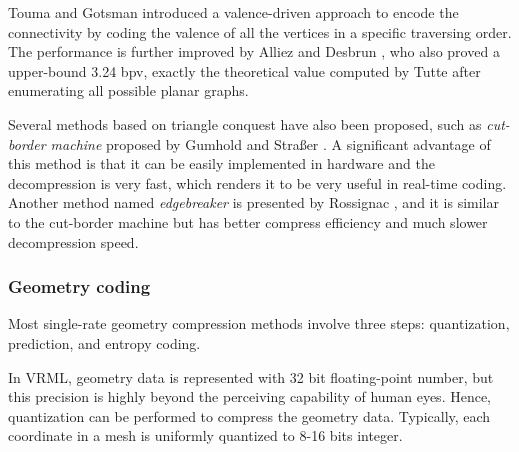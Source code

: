 \documentclass[11pt, a4paper]{report}
\begin{document}
    Touma and Gotsman \cite{triangle:Touma} introduced a
    valence-driven approach to encode the connectivity by coding the
    valence of all the vertices in a specific traversing order. 
    The performance is further improved
    by Alliez and Desbrun \cite{alliez01valencedriven}, who also proved a
    upper-bound 3.24 bpv, exactly the theoretical value computed
    by Tutte \cite{census:Tutte} after enumerating all possible planar
    graphs.

    Several methods based on triangle conquest have also been
    proposed, such as \emph{cut-border machine} proposed by 
    Gumhold and Stra\ss{}er \cite{280836}.
    A significant advantage of this method is that it can be easily implemented
    in hardware and the decompression is very fast, which
    renders it to be very useful in real-time coding. 
    Another method named \emph{edgebreaker} is presented by Rossignac \cite{614421},
    and it is similar to the cut-border machine but has better
    compress efficiency and much slower decompression speed.

    \subsubsection*{Geometry coding}
    Most single-rate geometry compression methods involve three steps:
    quantization, prediction, and entropy coding.

    In VRML, geometry data is represented with 32 bit floating-point
    number, but this precision is highly beyond the perceiving
    capability of human eyes. Hence, quantization can be performed to
    compress the geometry data. Typically, each coordinate in a mesh is
    uniformly quantized to 8-16 bits integer.
\end{document}
